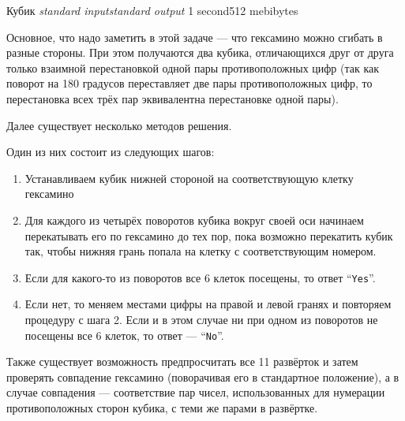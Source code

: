 \begin{problem}{Кубик}
{\textsl{standard input}}{\textsl{standard output}}
{1 second}{512 mebibytes}{}

Основное, что надо заметить в этой задаче --- что гексамино можно сгибать в разные стороны. При этом получаются два кубика, отличающихся друг от друга только взаимной перестановкой одной пары противоположных цифр (так как поворот на 180 градусов переставляет две пары противоположных цифр, то перестановка всех трёх пар эквивалентна перестановке одной пары). 

Далее существует несколько методов решения. 

Один из них состоит из следующих шагов:

\begin{enumerate}
\item Устанавливаем кубик нижней стороной на соответствующую клетку гексамино

\item Для каждого из четырёх поворотов кубика вокруг своей оси начинаем перекатывать его по гексамино до тех пор, пока возможно перекатить кубик так, чтобы нижняя грань попала на клетку с соответствующим номером. 

\item Если для какого-то из поворотов все 6 клеток посещены, то ответ ``\texttt{Yes}''. 

\item Если нет, то меняем местами цифры на правой и левой гранях и повторяем процедуру с шага 2. Если и в этом случае ни при одном из поворотов не посещены все 6 клеток, то ответ --- ``\texttt{No}''.
\end{enumerate}

Также существует возможность предпросчитать все 11 развёрток и затем проверять совпадение гексамино (поворачивая его в стандартное положение),
а в случае совпадения --- соответствие пар чисел, использованных для нумерации противоположных сторон кубика, с теми же парами в развёртке.

\end{problem}

